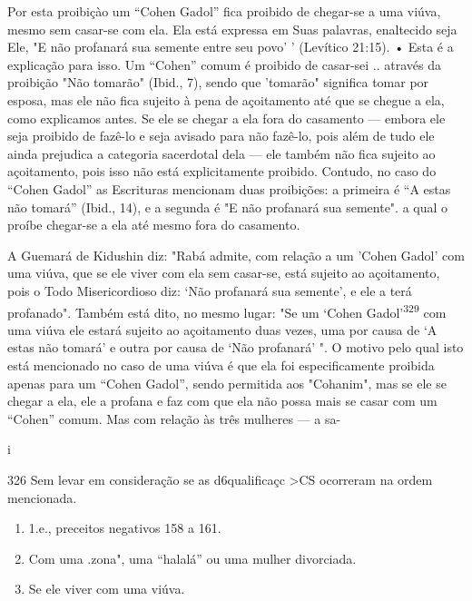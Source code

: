 Por esta proibiçào um ``Cohen Gadol'' fica proibido de chegar-se a uma
viúva, mesmo sem casar-se com ela. Ela está expressa em Suas palavras,
enal­tecido seja Ele, "E não profanará sua semente entre seu povo' '
(Levítico 21:15). • Esta é a explicação para isso. Um ``Cohen'' comum é
proibido de casar-sei .. através da proibição "Não
tomarão" (Ibid., 7), sendo que 'tomarão" sig­nifica tomar por esposa,
mas ele não fica sujeito à pena de açoitamento até que se chegue a ela,
como explicamos antes. Se ele se chegar a ela fora do casamento ---
embora ele seja proibido de fazê-lo e seja avisado para não fazê-lo,
pois além de tudo ele ainda prejudica a categoria sacerdotal dela ---
ele também não fica sujeito ao açoitamento, pois isso não está
explicitamente proibido. Contudo, no caso do ``Cohen Gadol'' as Escrituras
mencionam duas proibições: a primei­ra é ``A estas não tomará'' (Ibid.,
14), e a segunda é "E não profanará sua semen­te". a qual o proíbe
chegar-se a ela até mesmo fora do casamento.

A Guemará de Kidushin diz: "Rabá admite, com relação a um 'Co­hen Gadol'
com uma viúva, que se ele viver com ela sem casar-se, está sujeito ao
açoitamento, pois o Todo Misericordioso diz: `Não profanará sua
semente', e ele a terá profanado". Também está dito, no mesmo lugar: "Se
um `Cohen Gadol'\textsuperscript{329} com uma viúva ele estará sujeito
ao açoitamento duas vezes, uma por causa de `A estas não tomará' e outra
por causa de `Não profanará' ". O motivo pelo qual isto está mencionado
no caso de uma viúva é que ela foi especifica­mente proibida apenas para
um ``Cohen Gadol'', sendo permitida aos "Coha­nim", mas se ele se chegar a
ela, ele a profana e faz com que ela não possa mais se casar com um
``Cohen'' comum. Mas com relação às três mulheres --- a sa-

i

326 Sem levar em consideração se as d6qualificaçc \textgreater CS
ocorreram na ordem mencionada.


\begin{enumerate}
\def\labelenumi{\arabic{enumi}.}
\setcounter{enumi}{326}
\item
 
 1.e., preceitos negativos 158 a 161.
 
\item
 
 Com uma .zona", uma ``halalá'' ou uma mulher
 divorciada.
 
\item
 
 Se ele viver com uma viúva.
 
\end{enumerate}


